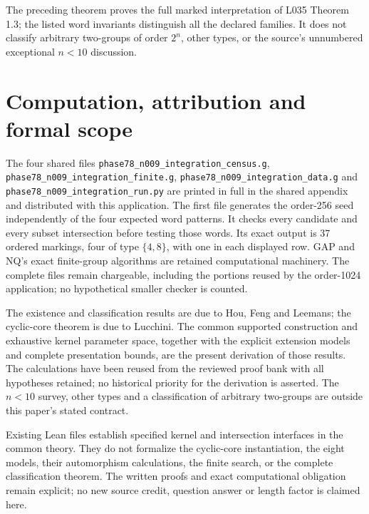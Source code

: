 The preceding theorem proves the full marked interpretation of L035 Theorem 1.3; the listed word invariants distinguish all the declared families. It does not classify arbitrary two-groups of order \(2^n\), other types, or the source's unnumbered exceptional \(n<10\) discussion.

\section{Computation, attribution and formal scope}
The four shared files \texttt{phase78\_\allowbreak n009\_\allowbreak integration\_\allowbreak census.g},
\texttt{phase78\_\allowbreak n009\_\allowbreak integration\_\allowbreak finite.g},
\texttt{phase78\_\allowbreak n009\_\allowbreak integration\_\allowbreak data.g} and
\texttt{phase78\_\allowbreak n009\_\allowbreak integration\_\allowbreak run.py} are printed in full in the
shared appendix and distributed with this application. The first file
generates the order-256 seed independently of the four expected word
patterns. It checks every candidate and every subset intersection before
testing those words. Its exact output is 37 ordered markings, four of
type $\{4,8\}$, with one in each displayed row. GAP and NQ's exact
finite-group algorithms are retained computational machinery. The
complete files remain chargeable, including the portions reused by the
order-1024 application; no hypothetical smaller checker is counted.

The existence and classification results are due to Hou, Feng and
Leemans; the cyclic-core theorem is due to Lucchini. The common
supported construction and exhaustive kernel parameter space, together
with the explicit extension models and complete presentation bounds,
are the present derivation of those results. The calculations have been
reused from the reviewed proof bank with all hypotheses retained; no
historical priority for the derivation is asserted. The $n<10$ survey,
other types and a classification of arbitrary two-groups are outside
this paper's stated contract.

Existing Lean files establish specified kernel and intersection
interfaces in the common theory. They do not formalize the cyclic-core
instantiation, the eight models, their automorphism calculations, the
finite search, or the complete classification theorem. The written
proofs and exact computational obligation remain explicit; no new
source credit, question answer or length factor is claimed here.

